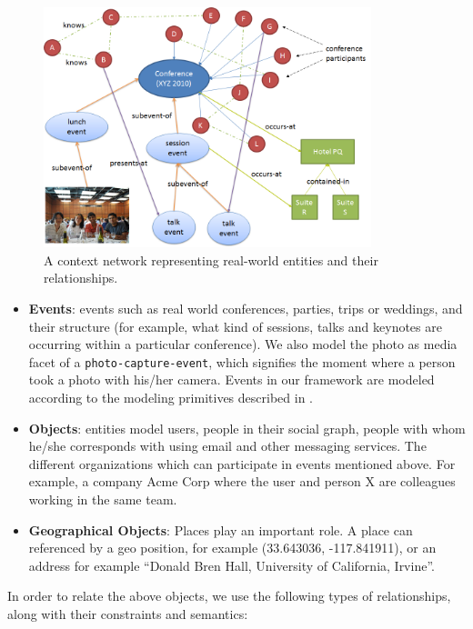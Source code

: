 \begin{figure}[h]
\centering
\includegraphics[width=0.85\textwidth]{media/chapter2/context-network-large.png}
\caption{A context network representing real-world entities and their relationships.}
\label{fig:context-network-large}
\end{figure}

\begin{itemize}
\item \textbf{Events}: events such as real world conferences, parties, trips or weddings, and their structure (for example, what kind of sessions, talks and keynotes are occurring within a particular conference). We also model the photo as media facet of a \texttt{photo-capture-event}, which signifies the moment where a person took a photo with his/her camera. Events in our framework are modeled according to the modeling primitives described in \cite{gupta2011managing, westermann2007toward}.

\item \textbf{Objects}: entities model users, people in their social graph, people with whom he/she corresponds with using email and other messaging services. The different organizations which can participate in events mentioned above. For example, a company Acme Corp where the user and person X are colleagues working in the same team.

\item \textbf{Geographical Objects}: Places play an important role. A place can referenced by a geo position, for example (33.643036, -117.841911), or an address for example ``Donald Bren Hall, University of California, Irvine''. 
\end{itemize}

In order to relate the above objects, we use the following types of relationships, along with their constraints and semantics:

